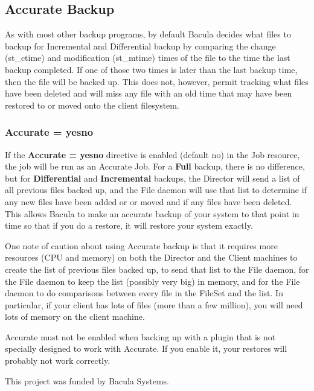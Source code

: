 \subsection{Accurate Backup}

As with most other backup programs, by default Bacula decides what files to
backup for Incremental and Differential backup by comparing the change
(st\_ctime) and modification (st\_mtime) times of the file to the time the last
backup completed.  If one of those two times is later than the last backup
time, then the file will be backed up.  This does not, however, permit tracking
what files have been deleted and will miss any file with an old time that may
have been restored to or moved onto the client filesystem.

\subsubsection{Accurate = \lt{}yes\vb{}no\gt{}}
If the {\bf Accurate = \lt{}yes\vb{}no\gt{}} directive is enabled (default no) in
the Job resource, the job will be run as an Accurate Job. For a {\bf Full}
backup, there is no difference, but for {\bf Differential} and {\bf
  Incremental} backups, the Director will send a list of all previous files
backed up, and the File daemon will use that list to determine if any new files
have been added or or moved and if any files have been deleted. This allows
Bacula to make an accurate backup of your system to that point in time so that
if you do a restore, it will restore your system exactly.  

One note of caution
about using Accurate backup is that it requires more resources (CPU and memory)
on both the Director and the Client machines to create the list of previous
files backed up, to send that list to the File daemon, for the File daemon to
keep the list (possibly very big) in memory, and for the File daemon to do
comparisons between every file in the FileSet and the list.  In particular,
if your client has lots of files (more than a few million), you will need
lots of memory on the client machine.

Accurate must not be enabled when backing up with a plugin that is not
specially designed to work with Accurate. If you enable it, your restores
will probably not work correctly.

This project was funded by Bacula Systems.
                                       


